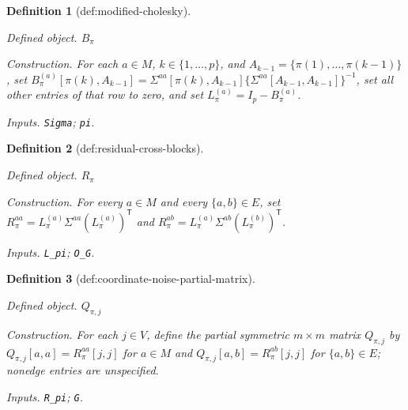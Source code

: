 \documentclass{article}
\newtheorem{definition}{Definition}
\begin{document}
\begin{definition}[def:modified-cholesky]\label{def:modified-cholesky}
\par\smallskip\noindent\emph{Defined object.} \(B_\pi\)
\par\smallskip\noindent\emph{Construction.} For each \(a\in M\), \(k\in\{1,\ldots,p\}\), and \(A_{k-1}=\{\pi(1),\ldots,\pi(k-1)\}\), set \(B_\pi^{(a)}[\pi(k),A_{k-1}]=\Sigma^{aa}[\pi(k),A_{k-1}]\{\Sigma^{aa}[A_{k-1},A_{k-1}]\}^{-1}\), set all other entries of that row to zero, and set \(L_\pi^{(a)}=I_p-B_\pi^{(a)}\).
\par\smallskip\noindent\emph{Inputs.} \texttt{Sigma}; \texttt{pi}.
\end{definition}

\begin{definition}[def:residual-cross-blocks]\label{def:residual-cross-blocks}
\par\smallskip\noindent\emph{Defined object.} \(R_\pi\)
\par\smallskip\noindent\emph{Construction.} For every \(a\in M\) and every \(\{a,b\}\in E\), set \(R_\pi^{aa}=L_\pi^{(a)}\Sigma^{aa}(L_\pi^{(a)})^{\mathsf T}\) and \(R_\pi^{ab}=L_\pi^{(a)}\Sigma^{ab}(L_\pi^{(b)})^{\mathsf T}\).
\par\smallskip\noindent\emph{Inputs.} \texttt{L\_\allowbreak{}pi}; \texttt{O\_\allowbreak{}G}.
\end{definition}

\begin{definition}[def:coordinate-noise-partial-matrix]\label{def:coordinate-noise-partial-matrix}
\par\smallskip\noindent\emph{Defined object.} \(Q_{\pi,j}\)
\par\smallskip\noindent\emph{Construction.} For each \(j\in V\), define the partial symmetric \(m\times m\) matrix \(Q_{\pi,j}\) by \(Q_{\pi,j}[a,a]=R_\pi^{aa}[j,j]\) for \(a\in M\) and \(Q_{\pi,j}[a,b]=R_\pi^{ab}[j,j]\) for \(\{a,b\}\in E\); nonedge entries are unspecified.
\par\smallskip\noindent\emph{Inputs.} \texttt{R\_\allowbreak{}pi}; \texttt{G}.
\end{definition}
\end{document}
